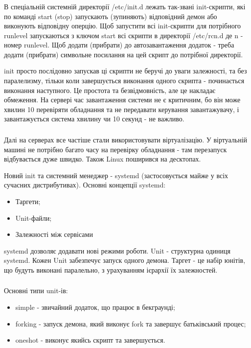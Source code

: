 \documentclass[t]{beamer}  %
\begin{document}
\begin{frame}
 	\frametitle{\insertsection} 
 	\framesubtitle{\insertsubsection}
В спеціальній системній директорії /etc/init.d лежать так-звані init-скрипти, які по команді start (stop) запускають (зупиняють) відповідний демон або виконують відповідну оперцію. Щоб запустити всі init-скрипти для потрібного runlevel запускаються з ключом start всі скрипти в директорії /etc/rcn.d де n - номер runlevel. Щоб додати (прибрати) до автозавантаження додаток - треба додати (прибрати) символьне посилання на цей скрипт до потрібної директорії. 

init просто послідовно запускав ці скрипти не беручі до уваги залежності, та без паралелизму, тільки коли завершується виконання одного скрипта - починається виконання наступного. Це простота та безвідмовність, але це накладає обмеження. На сервері час завантаження системи не є критичним, бо він може хвилин 10 перевіряти обладнання та не передавати керування завантажувачу, і завантажується система хвилину чи 10 секунд - не важливо.
\end{frame}
 	
\begin{frame}
 	\frametitle{\insertsection} 
 	\framesubtitle{\insertsubsection} 	
Далі на серверах все частіше стали використовувати віртуалізацію. У віртуальній машині не потрібно багато часу на перевірку обладнання - там перезапуск відбувається дуже швидко. Також Linux поширився на десктопах.

Новий init та системний менеджер - systemd (застосовується майже у всіх сучасних дистрибутивах). Основні концепції systemd:
\begin{itemize}
  \item Таргети;
  \item Unit-файли;
  \item Залежності між сервісами
\end{itemize}
systemd дозволяє додавати нові режими роботи. Unit - структурна одиниця systemd. Кожен Unit забезпечує запуск одного демона. Таргет - це набір юнітів, що будуть виконані паралельно, з урахуванням ієрархії їх залежностей.
\end{frame}

\begin{frame}
 	\frametitle{\insertsection} 
 	\framesubtitle{\insertsubsection} 	
Основні типи unit-ів:
\begin{itemize}
  \item simple - звичайний додаток, що працює в бекграунді;
  \item forking - запуск демона, який виконує fork та завершує батьківський процес;
  \item oneshot - виконує якийсь скрипт та завершується. 
\end{itemize}
\end{frame}
\end{document}
